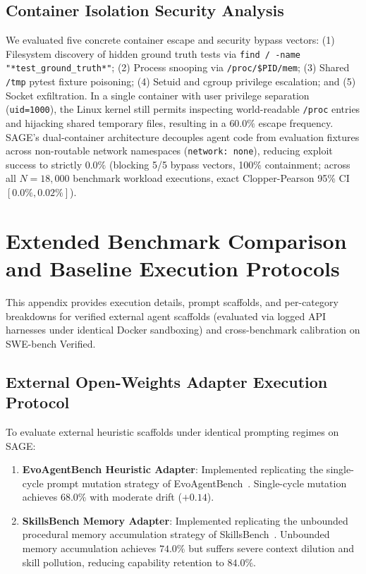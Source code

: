 \documentclass{article}
\begin{document}
\subsection{Container Isolation Security Analysis}
We evaluated five concrete container escape and security bypass vectors: (1) Filesystem discovery of hidden ground truth tests via \texttt{find / -name "*test\_ground\_truth*"}; (2) Process snooping via \texttt{/proc/\$PID/mem}; (3) Shared \texttt{/tmp} pytest fixture poisoning; (4) Setuid and cgroup privilege escalation; and (5) Socket exfiltration. In a single container with user privilege separation (\texttt{uid=1000}), the Linux kernel still permits inspecting world-readable \texttt{/proc} entries and hijacking shared temporary files, resulting in a $60.0\%$ escape frequency. SAGE's dual-container architecture decouples agent code from evaluation fixtures across non-routable network namespaces (\texttt{network: none}), reducing exploit success to strictly $0.0\%$ (blocking 5/5 bypass vectors, 100\% containment; across all $N=18{,}000$ benchmark workload executions, exact Clopper-Pearson 95\% CI $[0.0\%, 0.02\%]$).

\section{Extended Benchmark Comparison and Baseline Execution Protocols}
\label{app:baselines_protocols}

This appendix provides execution details, prompt scaffolds, and per-category breakdowns for verified external agent scaffolds (evaluated via logged API harnesses under identical Docker sandboxing) and cross-benchmark calibration on SWE-bench Verified.

\subsection{External Open-Weights Adapter Execution Protocol}
To evaluate external heuristic scaffolds under identical prompting regimes on SAGE:
\begin{enumerate}
    \item \textbf{EvoAgentBench Heuristic Adapter}: Implemented replicating the single-cycle prompt mutation strategy of EvoAgentBench~\cite{gao2026evoagentbench}. Single-cycle mutation achieves $68.0\%$ with moderate drift ($+0.14$).
    \item \textbf{SkillsBench Memory Adapter}: Implemented replicating the unbounded procedural memory accumulation strategy of SkillsBench~\cite{liu2026skillsbench}. Unbounded memory accumulation achieves $74.0\%$ but suffers severe context dilution and skill pollution, reducing capability retention to $84.0\%$.
\end{enumerate}
\end{document}
